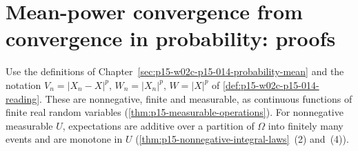 \section{Mean-power convergence from convergence in probability: proofs}
\label{sec:annex-p15-w02c-p15-014-probability-mean}

Use the definitions of Chapter~\ref{sec:p15-w02c-p15-014-probability-mean}
and the notation \(V_n=|X_n-X|^p\), \(W_n=|X_n|^p\), \(W=|X|^p\) of
\cref{def:p15-w02c-p15-014-reading}. These are nonnegative, finite and
measurable, as continuous functions of finite real random variables
(\cref{thm:p15-measurable-operations}). For nonnegative measurable \(U\),
expectations are additive over a partition of \(\Omega\) into finitely
many events and are monotone in \(U\)
(\cref{thm:p15-nonnegative-integral-laws}~(2) and~(4)).


